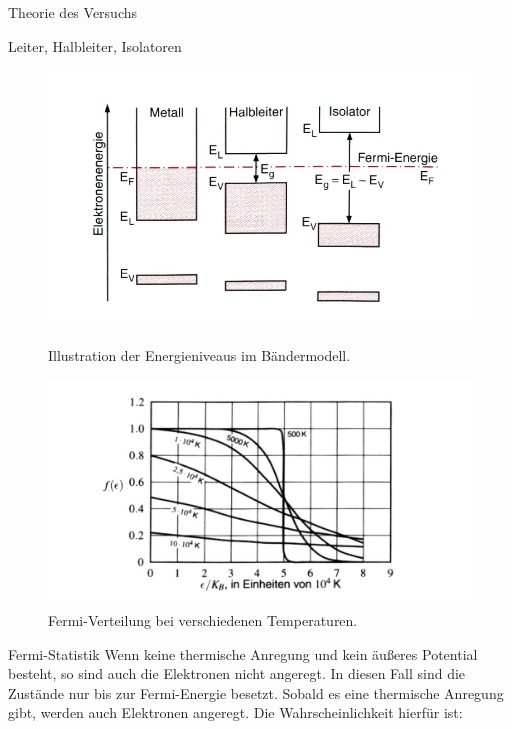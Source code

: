 \documentclass[pdftex, a4paper,11pt, twoside, ngerman]{report}
\begin{document}
\begin{chapter}{Theorie des Versuchs}
\begin{section}{Leiter, Halbleiter, Isolatoren}
            \begin{figure}[t]
              \centering
              \begin{minipage}{.49\textwidth}
                \centering
                \includegraphics[width=\textwidth]{Figures/Baendermodell.png}
                \caption{Illustration der Energieniveaus im Bändermodell.}
                \label{fig:Baendermodell}
              \end{minipage}
              \begin{minipage}{.49\textwidth}
                \centering
                \includegraphics[width=\textwidth]{Figures/Fermi.png}
                \caption{Fermi-Verteilung bei verschiedenen Temperaturen.}
                \label{fig:FermiTemp}
              \end{minipage}
            \end{figure}

        \end{section}

        \begin{section}{Fermi-Statistik}
            Wenn keine thermische Anregung und kein äußeres Potential besteht, so sind auch die Elektronen nicht angeregt.
            In diesen Fall sind die Zustände nur bis zur Fermi-Energie besetzt.
            Sobald es eine thermische Anregung gibt, werden auch Elektronen angeregt. Die Wahrscheinlichkeit hierfür ist:
            

\end{section}
\end{chapter}
\end{document}
